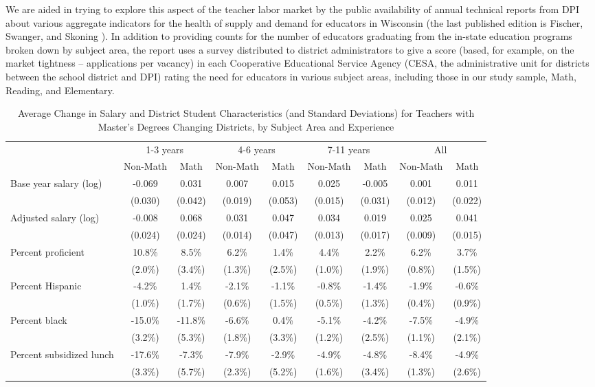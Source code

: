 We are aided in trying to explore this aspect of the teacher labor
market by the public availability of annual technical reports from DPI
about various aggregate indicators for the health of supply and demand
for educators in Wisconsin (the last published edition is Fischer,
Swanger, and Skoning \citeyear{fischer}). In addition
to providing counts for the number of educators graduating from the
in-state education programs broken down by subject area, the report uses
a survey distributed to district administrators to give a score (based,
for example, on the market tightness -- applications per vacancy) in
each Cooperative Educational Service Agency (CESA, the administrative
unit for districts between the school district and DPI) rating the need
for educators in various subject areas, including those in our study
sample, Math, Reading, and Elementary.

\begin{sidewaystable}[htbp]
\centering
\begin{tabular}{lcccccccc}
  \hline
 & \multicolumn{2}{c}{1-3 years} & \multicolumn{2}{c}{4-6 years} & \multicolumn{2}{c}{7-11 years} & \multicolumn{2}{c}{All}\\ \cline{2-3} \cline{4-5} \cline{6-7} \cline{8-9}
 & Non-Math & Math & Non-Math & Math & Non-Math & Math & Non-Math & Math \\ 
  \hline
Base year salary (log) & -0.069 & 0.031 & 0.007 & 0.015 & 0.025 & -0.005 & 0.001 & 0.011 \\ 
   & (0.030) & (0.042) & (0.019) & (0.053) & (0.015) & (0.031) & (0.012) & (0.022) \\ 
  Adjusted salary (log) & -0.008 & 0.068 & 0.031 & 0.047 & 0.034 & 0.019 & 0.025 & 0.041 \\ 
   & (0.024) & (0.024) & (0.014) & (0.047) & (0.013) & (0.017) & (0.009) & (0.015) \\ 
  Percent proficient & 10.8\% & 8.5\% & 6.2\% & 1.4\% & 4.4\% & 2.2\% & 6.2\% & 3.7\% \\ 
   & (2.0\%) & (3.4\%) & (1.3\%) & (2.5\%) & (1.0\%) & (1.9\%) & (0.8\%) & (1.5\%) \\ 
  Percent Hispanic & -4.2\% & 1.4\% & -2.1\% & -1.1\% & -0.8\% & -1.4\% & -1.9\% & -0.6\% \\ 
   & (1.0\%) & (1.7\%) & (0.6\%) & (1.5\%) & (0.5\%) & (1.3\%) & (0.4\%) & (0.9\%) \\ 
  Percent black & -15.0\% & -11.8\% & -6.6\% & 0.4\% & -5.1\% & -4.2\% & -7.5\% & -4.9\% \\ 
   & (3.2\%) & (5.3\%) & (1.8\%) & (3.3\%) & (1.2\%) & (2.5\%) & (1.1\%) & (2.1\%) \\ 
  Percent subsidized lunch & -17.6\% & -7.3\% & -7.9\% & -2.9\% & -4.9\% & -4.8\% & -8.4\% & -4.9\% \\ 
   & (3.3\%) & (5.7\%) & (2.3\%) & (5.2\%) & (1.6\%) & (3.4\%) & (1.3\%) & (2.6\%) \\ 
   \hline
\end{tabular}
\caption{Average Change in Salary and District Student Characteristics (and Standard Deviations) for Teachers with Master's Degrees Changing Districts, by Subject Area and Experience} 
\label{tbl:change_area_by_ge}
\end{sidewaystable}

